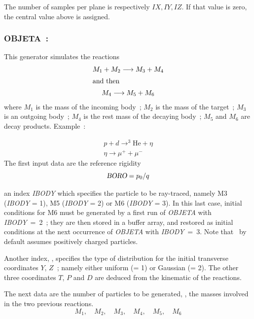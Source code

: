 \medskip

\noindent The number of samples per plane is respectively $IX, IY, IZ$.  If that value is zero, 
the central value above is assigned. 
 

\newpage


\subsubsection{OBJETA~:   \OBJETATitl\ \protect\cite{Biblio9}}  %
\medskip 
 \label{OBJETA} 
 
This generator simulates the reactions 
%
\begin{gather*}
     M_1+M_2 \longrightarrow  M_3+M_4  \\
\intertext{and then} 
     M_4 \longrightarrow  M_5 + M_6 
\end{gather*}
%
where  $ M_1 $ is the mass of the incoming body~; $ M_2 $ is the mass
of the target~;  $ M_3 $ is an outgoing body~;  $ M_4 $ is the rest mass of the
decaying body~; $ M_5 $ and $ M_6 $ are decay products. Example~: 

  \begin{gather*}
	  p+d \longrightarrow^3 \text{He}  + \eta  \\
	 \eta  \longrightarrow  \mu^ ++ \mu^-
  \end{gather*}
%   
\noindent The first input data are the reference rigidity 
$$ \textsl{BORO} = p_0 /  q $$

\noindent an index \textsl{IBODY} which specifies the particle to be ray-traced, namely
M3 (\textsl{IBODY} = 1),  M5 (\textsl{IBODY} = 2) or M6 (\textsl{IBODY} = 3).  In this last case, 
initial conditions for M6 must be generated by a first run of \textsl{OBJETA} with 
\mbox{\textsl{IBODY} = 2}~;  they are then stored in a buffer array, and restored as initial conditions
at the next occurrence of \textsl{OBJETA} with \mbox{\textsl{IBODY} = 3}. Note that
\zgou\ by default assumes positively charged particles.  
\bigskip

\noindent Another index, \KOBJ,  specifies the type of
distribution for the initial transverse coordinates $ Y$, $Z $~;   
namely either uniform (\KOBJ = 1) or Gaussian 
(\KOBJ = 2).  The other three coordinates $ T$, $P$ and $ D $ are 
deduced from the kinematic of the reactions.   
\bigskip

\noindent The next data are the number of particles to be generated, 
\IMAX{},  the masses involved  in the two previous
reactions. 
 $$ M_1,\quad M_2,\quad M_3,\quad M_4,\quad M_5,\quad M_6 $$

